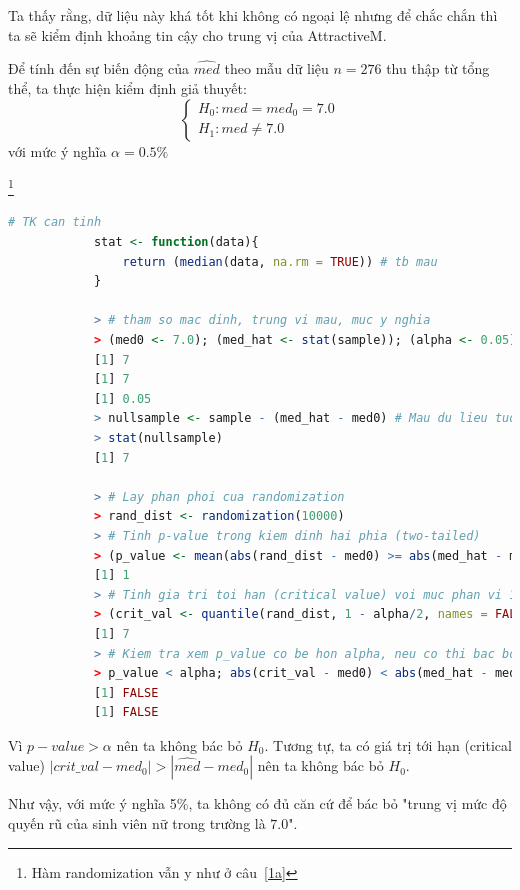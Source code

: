 \documentclass[a4paper,12pt]{article}
\begin{document}
\begin{enumerate}[label = \alph*)]
			Ta thấy rằng, dữ liệu này khá tốt khi không có ngoại lệ nhưng để chắc chắn thì ta sẽ kiểm định khoảng tin cậy cho trung vị của AttractiveM.
			
			
			Để tính đến sự biến động của $\hat{med}$ theo mẫu dữ liệu $n = 276$ thu thập từ tổng thể, ta thực hiện kiểm định giả thuyết:
			\begin{equation*}
			\begin{cases}
			H_0: med = med_0 = 7.0\\
			H_1: med \neq 7.0
			\end{cases}
			\end{equation*}
			với mức ý nghĩa $\alpha = 0.5\%$
			
			\footnote{Hàm randomization vẫn y như ở câu~\ref{1a}}
			\begin{lstlisting}[language=R]
			# TK can tinh
			stat <- function(data){
				return (median(data, na.rm = TRUE)) # tb mau
			}
			
			> # tham so mac dinh, trung vi mau, muc y nghia
			> (med0 <- 7.0); (med_hat <- stat(sample)); (alpha <- 0.05)
			[1] 7
			[1] 7
			[1] 0.05
			> nullsample <- sample - (med_hat - med0) # Mau du lieu tuong ung voi H0
			> stat(nullsample)
			[1] 7
			 
			> # Lay phan phoi cua randomization
			> rand_dist <- randomization(10000)
			> # Tinh p-value trong kiem dinh hai phia (two-tailed)
			> (p_value <- mean(abs(rand_dist - med0) >= abs(med_hat - med0)))
			[1] 1
			> # Tinh gia tri toi han (critical value) voi muc phan vi 1-alpha/2
			> (crit_val <- quantile(rand_dist, 1 - alpha/2, names = FALSE))
			[1] 7
			> # Kiem tra xem p_value co be hon alpha, neu co thi bac bo H0
			> p_value < alpha; abs(crit_val - med0) < abs(med_hat - med0)
			[1] FALSE
			[1] FALSE
			\end{lstlisting}
			
			Vì $p-value > \alpha$ nên ta không bác bỏ $H_0$. Tương tự, ta có giá trị tới hạn (critical value) $|crit\_val - med_0| > |\hat{med} - med_0|$ nên ta không bác bỏ $H_0$. 
			
			Như vậy, với mức ý nghĩa 5\%, ta không có đủ căn cứ để bác bỏ "trung vị mức độ quyến rũ của sinh viên nữ trong trường là $7.0$". 
			
	\end{enumerate}
	
\end{document}
